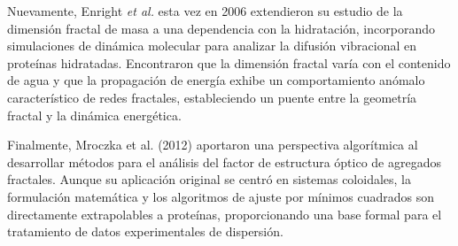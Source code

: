 Nuevamente, Enright \textit{et al.}\cite{Enright2006} esta vez en 2006 extendieron su estudio de la dimensión fractal de masa a una dependencia con la hidratación, incorporando simulaciones de dinámica molecular para analizar la difusión vibracional en proteínas hidratadas. Encontraron que la dimensión fractal varía con el contenido de agua y que la propagación de energía exhibe un comportamiento anómalo característico de redes fractales, estableciendo un puente entre la geometría fractal y la dinámica energética.

Finalmente, Mroczka et al. (2012)\cite{Mroczka2012} aportaron una perspectiva algorítmica al desarrollar métodos para el análisis del factor de estructura óptico de agregados fractales. Aunque su aplicación original se centró en sistemas coloidales, la formulación matemática y los algoritmos de ajuste por mínimos cuadrados son directamente extrapolables a proteínas, proporcionando una base formal para el tratamiento de datos experimentales de dispersión.

\color{black}

